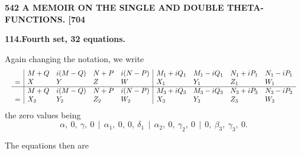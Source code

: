 \documentclass[11pt]{article}
\begin{document}
\newpage
\noindent\textbf{542 \hfill A MEMOIR ON THE SINGLE AND DOUBLE THETA-FUNCTIONS. \hfill [704}

\medskip
\begin{center}\textbf{114.\quad Fourth set, 32 equations.}\end{center}

Again changing the notation, we write
\[
\resizebox{\textwidth}{!}{$\displaystyle
\begin{array}{l|llll|llll}
& M+Q & i(M-Q) & N+P & i(N-P) & M_1+iQ_1 & M_1-iQ_1 & N_1+iP_1 & N_1-iP_1\\
= & X & Y & Z & W & X_1 & Y_1 & Z_1 & W_1\\\hline
& M+Q & i(M-Q) & N+P & i(N-P) & M_3+iQ_3 & M_3-iQ_3 & N_3+iP_3 & N_3-iP_3\\
= & X_2 & Y_2 & Z_2 & W_2 & X_3 & Y_3 & Z_3 & W_3\\
\end{array}
$}
\]
the zero values being
\[
\alpha,\ 0,\ \gamma,\ 0\ \ |\ \ \alpha_1,\ 0,\ 0,\ \delta_1\ \ |\ \ \alpha_2,\ 0,\ \gamma_2,\ 0\ \ |\ \ 0,\ \beta_3,\ \gamma_3,\ 0.
\]

The equations then are
\end{document}

